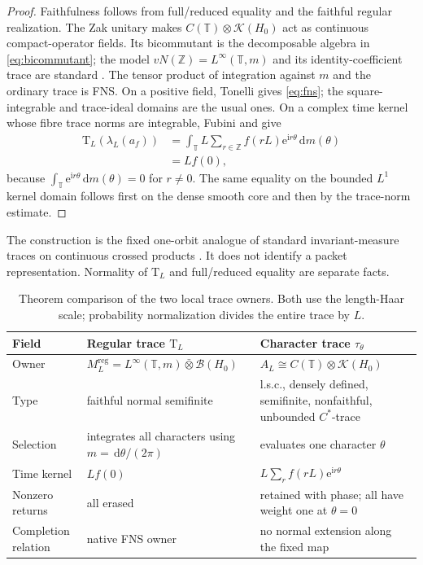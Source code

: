 \documentclass[11pt]{article}
\theoremstyle{definition}
\newcommand{\Z}{\mathbb{Z}}
\newcommand{\T}{\mathbb{T}}
\newcommand{\K}{\mathcal{K}}
\newcommand{\B}{\mathcal{B}}
\newcommand{\dd}{\,\mathrm{d}}
\newcommand{\e}{\mathrm{e}}
\newcommand{\ii}{\mathrm{i}}
\newcommand{\Tau}{\mathrm{T}}
\begin{document}
\begin{proof}
Faithfulness follows from full/reduced equality and the faithful regular realization.  The Zak unitary makes \(C(\T)\otimes\K(H_0)\) act as continuous compact-operator fields.  Its bicommutant is the decomposable algebra in \eqref{eq:bicommutant}; the model \(vN(\Z)=L^\infty(\T,m)\) and its identity-coefficient trace are standard \cite[pp.~15--16]{Jones2009}.  The tensor product of integration against \(m\) and the ordinary trace is FNS.  On a positive field, Tonelli gives \eqref{eq:fns}; the square-integrable and trace-ideal domains are the usual ones.  On a complex time kernel whose fibre trace norms are integrable, Fubini and  give
\begin{align*}
 \Tau_L(\lambda_L(a_f))
 &=\int_{\T} L\sum_{r\in\Z}f(rL)\e^{\ii r\theta}\dd m(\theta)\\
 &=L f(0),
\end{align*}
because \(\int_{\T}\e^{\ii r\theta}\dd m(\theta)=0\) for \(r\ne0\).  The same equality on the bounded \(L^1\) kernel domain follows first on the dense smooth core and then by the trace-norm estimate.
\end{proof}

The construction is the fixed one-orbit analogue of standard invariant-measure traces on continuous crossed products \cite[Proposition~3.2 and Lemma~7.4]{BourneRennie2018}.  It does not identify a packet representation.  Normality of \(\Tau_L\) and full/reduced equality are separate facts.

\begin{table}[htbp]
\centering\small
\caption{Theorem comparison of the two local trace owners.  Both use the length-Haar scale; probability normalization divides the entire trace by \(L\).}\label{tab:traces}
\begin{tabularx}{\textwidth}{P{0.23\textwidth}Y Y}
\toprule
Field & Regular trace \(\Tau_L\) & Character trace \(\tau_\theta\)\\
\midrule
Owner & \(M_L^{\mathrm{reg}}=L^\infty(\T,m)\bar\otimes\B(H_0)\) & \(A_L\cong C(\T)\otimes\K(H_0)\)\\
Type & faithful normal semifinite & l.s.c., densely defined, semifinite, nonfaithful, unbounded \(C^*\)-trace\\
Selection & integrates all characters using \(m=\dd\theta/(2\pi)\) & evaluates one character \(\theta\)\\
Time kernel & \(Lf(0)\) & \(L\sum_r f(rL)\e^{\ii r\theta}\)\\
Nonzero returns & all erased & retained with phase; all have weight one at \(\theta=0\)\\
Completion relation & native FNS owner & no normal extension along the fixed map\\
\bottomrule
\end{tabularx}
\end{table}
\end{document}
